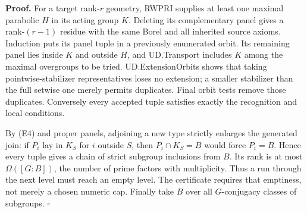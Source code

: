 \textbf{Proof.} For a target rank-\(r\) geometry, RWPRI supplies at
least one maximal parabolic \(H\) in its acting group \(K\). Deleting
its complementary panel gives a rank-\((r-1)\) residue with the same
Borel and all inherited source axioms. Induction puts its panel tuple in
a previously enumerated orbit. Its remaining panel lies inside \(K\) and
outside \(H\), and UD.Transport includes \(K\) among the maximal
overgroups to be tried. UD.ExtensionOrbits shows that taking
pointwise-stabilizer representatives loses no extension; a smaller
stabilizer than the full setwise one merely permits duplicates. Final
orbit tests remove those duplicates. Conversely every accepted tuple
satisfies exactly the recognition and local conditions.

By (E4) and proper panels, adjoining a new type strictly enlarges the
generated join: if \(P_i\) lay in \(K_S\) for \(i\) outside \(S\), then
\(P_i\cap K_S=B\) would force \(P_i=B\). Hence every tuple gives a chain
of strict subgroup inclusions from \(B\). Its rank is at most
\(\Omega([G:B])\), the number of prime factors with multiplicity. Thus a
run through the next level must reach an empty level. The certificate
requires that emptiness, not merely a chosen numeric cap. Finally take
\(B\) over all \(G\)-conjugacy classes of subgroups. \(\square\)
